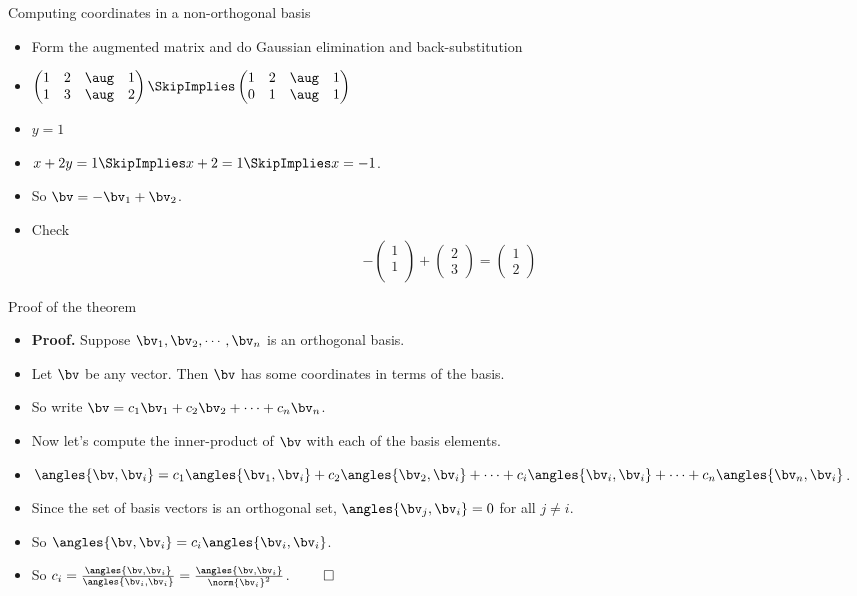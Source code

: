 \documentclass{beamer}
\begin{document}
\begin{frame}{Computing coordinates in a non-orthogonal basis}
\begin{itemize}
\item Form the augmented matrix and do Gaussian elimination and back-substitution
\item $\begin{pmatrix}
1 & 2 & \aug & 1\\
1 & 3 & \aug & 2
\end{pmatrix}
\SkipImplies
\begin{pmatrix}
1 & 2 & \aug & 1\\
0 & 1 & \aug & 1
\end{pmatrix}
$
\item $y=1$
\item $x + 2y = 1 \SkipImplies x +2 = 1 \SkipImplies x = -1$.
\item So $\bv = -\bv_1 + \bv_2$.
\item Check
$$
-\begin{pmatrix}1\\1\\\end{pmatrix} + \begin{pmatrix}2\\3\end{pmatrix}
=\begin{pmatrix}1\\2\end{pmatrix}
$$
\end{itemize}
\end{frame}
\begin{frame}{Proof of the theorem}
\begin{itemize}
\item \textbf{Proof.} Suppose $\bv_1,\bv_2,\cdots,\bv_n$ is an orthogonal basis.
\item Let $\bv$ be any vector. Then $\bv$ has some coordinates in terms of the basis.
\item So write $\bv = c_1\bv_1 + c_2\bv_2 + \cdots + c_n\bv_n$.
\item Now let's compute the inner-product of $\bv$ with each of the basis elements.
\item $\angles{\bv,\bv_i} = c_1\angles{\bv_1,\bv_i} + c_2\angles{\bv_2,\bv_i} + \cdots + c_i\angles{\bv_i,\bv_i} + \cdots + c_n\angles{\bv_n,\bv_i}$.
\item Since the set of basis vectors is an orthogonal set, $\angles{\bv_j,\bv_i} = 0$ for all $j\not=i$.
\item So $\angles{\bv,\bv_i} = c_i\angles{\bv_i,\bv_i}$.
\item So $c_i = \frac{\angles{\bv,\bv_i}}{\angles{\bv_i,\bv_i}} = \frac{\angles{\bv,\bv_i}}{\norm{\bv_i}^2}$. $\qed$
\end{itemize}
\end{frame}
\end{document}
